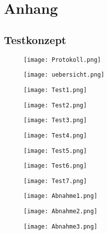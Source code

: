 \section{Anhang} \label{sec:anhang}


\subsection{Testkonzept} \label{subsec:eltech}
\begin{figure}[H]
	\centering
	\texttt{[image: Protokoll.png]}
	\label{fig:Protokoll}
\end{figure}

\begin{figure}[H]
	\centering
	\texttt{[image: uebersicht.png]}
	\label{fig:übersicht}
\end{figure}

\begin{figure}[H]
	\centering
	\texttt{[image: Test1.png]}
	\label{fig:Test1}
\end{figure}

\begin{figure}[H]
	\centering
	\texttt{[image: Test2.png]}
	\label{fig:Test2}
\end{figure}

\begin{figure}[H]
	\centering
	\texttt{[image: Test3.png]}
	\label{fig:Test3}
\end{figure}

\begin{figure}[H]
	\centering
	\texttt{[image: Test4.png]}
	\label{fig:Test4}
\end{figure}

\begin{figure}[H]
	\centering
	\texttt{[image: Test5.png]}
	\label{fig:Test5}
\end{figure}

\begin{figure}[H]
	\centering
	\texttt{[image: Test6.png]}
	\label{fig:Test6}
\end{figure}

\begin{figure}[H]
	\centering
	\texttt{[image: Test7.png]}
	\label{fig:Test7}
\end{figure}

\begin{figure}[H]
	\centering
	\texttt{[image: Abnahme1.png]}
	\label{fig:Protokoll}
\end{figure}
\begin{figure}[H]
	\centering
	\texttt{[image: Abnahme2.png]}
	\label{fig:Protokoll}
\end{figure}
\begin{figure}[H]
	\centering
	\texttt{[image: Abnahme3.png]}
	\label{fig:Protokoll}
\end{figure}

